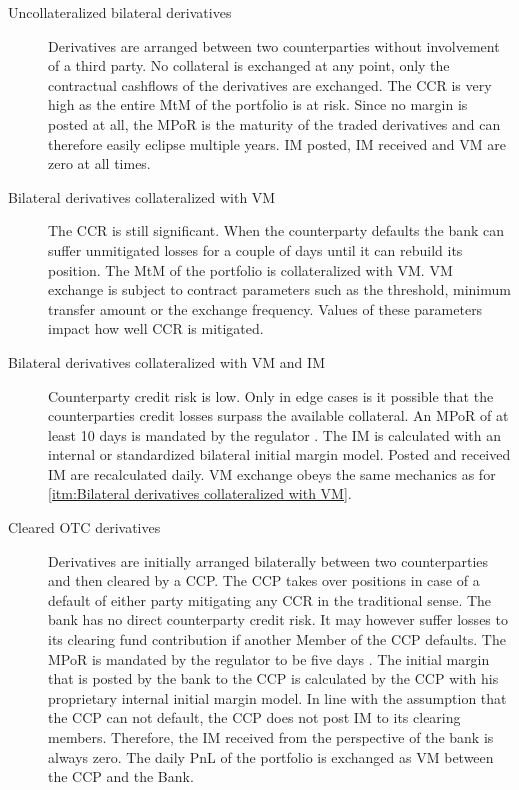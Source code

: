 \documentclass[../Thesis_AHoecherl.tex]{subfiles}
\begin{document}
\begin{description}
    \item[Uncollateralized bilateral derivatives\label{itm:Uncollateralized bilateral derivatives}] 
    Derivatives are arranged between two counterparties without involvement of a third party. No collateral is exchanged at any point, only the contractual cashflows of the derivatives are exchanged. The \gls{CCR} is very high as the entire \gls{MtM} of the portfolio is at risk. Since no margin is posted at all, the \gls{MPoR} is the maturity of the traded derivatives and can therefore easily eclipse multiple years. \gls{IM} posted, \gls{IM} received and \gls{VM} are zero at all times.
    \item[Bilateral derivatives collateralized with VM\label{itm:Bilateral derivatives collateralized with VM}] 
    The \gls{CCR} is still significant. When the counterparty defaults the bank can suffer unmitigated losses for a couple of days until it can rebuild its position. The \gls{MtM} of the portfolio is collateralized with \gls{VM}. \gls{VM} exchange is subject to contract parameters such as the threshold, minimum transfer amount or the exchange frequency. Values of these parameters impact how well \gls{CCR} is mitigated.
    \item[Bilateral derivatives collateralized with \gls{VM} and \gls{IM}\label{itm:Bilateral derivatives collateralized with VM and IM}] 
    Counterparty credit risk is low. Only in edge cases is it possible that the counterparties credit losses surpass the available collateral. An \gls{MPoR} of at least 10 days is mandated by the regulator \cite[Requirement 3.1]{BCBS_MarginRequirements}. The \gls{IM} is calculated with an internal or standardized bilateral initial margin model. Posted and received \gls{IM} are recalculated daily. \gls{VM} exchange obeys the same mechanics as for \ref{itm:Bilateral derivatives collateralized with VM}.
    \item[Cleared \gls{OTC} derivatives\label{itm:Cleared OTC derivatives}] 
    Derivatives are initially arranged bilaterally between two counterparties and then cleared by a \gls{CCP}. The \gls{CCP} takes over positions in case of a default of either party mitigating any \gls{CCR} in the traditional sense. The bank has no direct counterparty credit risk. It may however suffer losses to its clearing fund contribution if another Member of the \gls{CCP} defaults. The \gls{MPoR} is mandated by the regulator to be five days \cite[Article 26]{CCP_margining_regulation}. The initial margin that is posted by the bank to the \gls{CCP} is calculated by the \gls{CCP} with his proprietary internal initial margin model. In line with the assumption that the \gls{CCP} can not default, the \gls{CCP} does not post \gls{IM} to its clearing members. Therefore, the \gls{IM} received from the perspective of the bank is always zero. The daily \gls{PnL} of the portfolio is exchanged as \gls{VM} between the \gls{CCP} and the Bank. 

\end{description}
\end{document}
